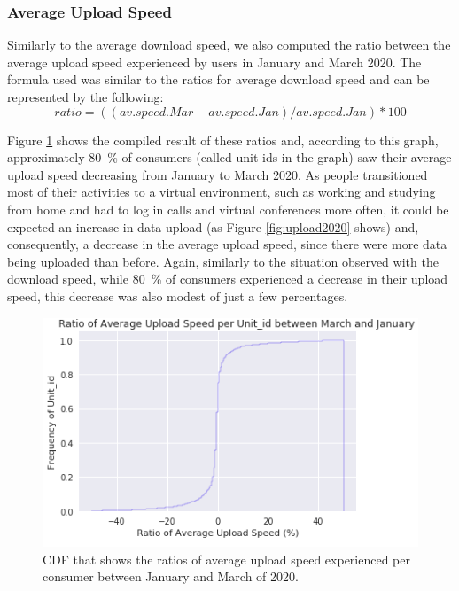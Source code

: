 \documentclass[conference,10pt]{IEEEtran}
\begin{document}
\subsubsection{Average Upload Speed}
\label{sec:average-upload-speed}
Similarly to the average download speed, we also computed the ratio between the average upload speed experienced by users in January and March 2020. The formula used was similar to the ratios for average download speed and can be represented by the following:
\begin{equation}
ratio= ((av.speed.Mar - av.speed.Jan)/ av.speed.Jan)*100
\end{equation}

Figure \ref{fig:uploadspeed2020} shows the compiled result of these ratios and, according to this graph, approximately \SI{80}{\percent} of consumers (called unit-ids in the graph) saw their average upload speed decreasing from January to March 2020. As people transitioned most of their activities to a virtual environment, such as working and studying from home and had to log in calls and virtual conferences more often, it could be expected an increase in data upload (as Figure \ref{fig:upload2020} shows) and, consequently, a decrease in the average upload speed, since there were more data being uploaded than before. Again, similarly to the situation observed with the download speed, while \SI{80}{\percent} of consumers experienced a decrease in their upload speed, this decrease was also modest of just a few percentages.

\begin{figure}
\centering
\includegraphics[width=1.0\linewidth]{figs/uploadspeed.PNG}
\caption{CDF that shows the ratios of average upload speed experienced per consumer between January and March of 2020.}
\label{fig:uploadspeed2020}
\end{figure}
\end{document}
